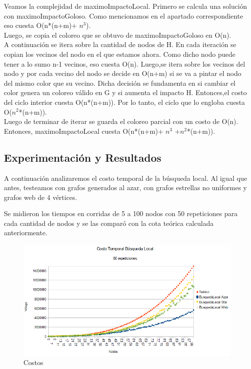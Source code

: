 \indent Veamos la complejidad de maximoImpactoLocal. Primero se calcula una solución con maximoImpactoGoloso. Como mencionamos en el apartado correspondiente eso cuesta O(n*(n+m)+ $n^{3}$). \\
\indent Luego, se copia el coloreo que se obtuvo de maximoImpactoGoloso en O(n).\\
\indent A continuación se itera sobre la cantidad de nodos de H. En cada iteración se copian los vecinos del nodo en el que estamos ahora. Como dicho nodo puede tener a lo sumo n-1 vecinos, eso cuesta O(n). Luego,se itera sobre los vecinos del nodo y por cada vecino del nodo se decide en O(n+m) si se va a pintar el nodo del mismo color que su vecino. Dicha decisión se fundamenta en si cambiar el color genera un coloreo válido en G y si aumenta el impacto H. Entonces,el costo del ciclo interior cuesta O(n*(n+m)). Por lo tanto, el ciclo que lo engloba cuesta O($n^{2}$*(n+m)).\\
\indent Luego de terminar de iterar se guarda el coloreo parcial con un costo de O(n).\\
\indent Entonces, maximoImpactoLocal cuesta O(n*(n+m)+ $n^{3}$ +$ n^{2}$*(n+m)).\\

\subsection{Experimentación y Resultados}

\quad A continuación analizaremos el costo temporal de la búsqueda local. Al igual que antes, testeamos con grafos generados al azar, con grafos estrellas no uniformes y grafos web de 4 vértices.

\quad Se midieron los tiempos en corridas de  5 a 100 nodos con 50 repeticiones para cada cantidad de nodos y se las comparó con la cota teórica calculada anteriormente.


\begin{figure}[H]
	\centering
	\includegraphics[scale=0.6]{timingBLocal.png}
\caption{Costos}
\end{figure}

